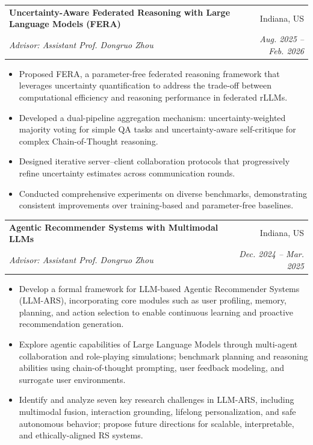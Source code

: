 \documentclass[letterpaper,10.8pt]{article}
\makeatletter
\newcommand{\resumeSubheading}[4]{
  \vspace{-1pt}\item
    \begin{tabular*}{0.97\textwidth}{l@{\extracolsep{\fill}}r}
      \textbf{#1} & #2 \\
      \textit{\small#3} & \textit{\small #4} \\
    \end{tabular*}\vspace{-5pt}
}
\makeatother
\begin{document}
\resumeSubheading
{Uncertainty-Aware Federated Reasoning with Large Language Models (FERA)}{Indiana, US}
{Advisor: Assistant Prof. Dongruo Zhou}{Aug. 2025 -- Feb. 2026}
\begin{itemize}[label=$\circ$, leftmargin=0.15in]
\setlength\itemsep{-0.1em}
\item Proposed FERA, a parameter-free federated reasoning framework that leverages uncertainty quantification to address the trade-off between computational efficiency and reasoning performance in federated rLLMs.
\item Developed a dual-pipeline aggregation mechanism: uncertainty-weighted majority voting for simple QA tasks and uncertainty-aware self-critique for complex Chain-of-Thought reasoning.
\item Designed iterative server–client collaboration protocols that progressively refine uncertainty estimates across communication rounds.
\item Conducted comprehensive experiments on diverse benchmarks, demonstrating consistent improvements over training-based and parameter-free baselines.
\end{itemize}



\resumeSubheading
{Agentic Recommender Systems with Multimodal LLMs}{Indiana, US}
{Advisor: Assistant Prof. Dongruo Zhou}{Dec. 2024 -- Mar. 2025}
\begin{itemize}[label=$\circ$, leftmargin=0.15in]
\setlength\itemsep{-0.1em}
\item Develop a formal framework for LLM-based Agentic Recommender Systems (LLM-ARS), incorporating core modules such as user profiling, memory, planning, and action selection to enable continuous learning and proactive recommendation generation.
\item Explore agentic capabilities of Large Language Models through multi-agent collaboration and role-playing simulations; benchmark planning and reasoning abilities using chain-of-thought prompting, user feedback modeling, and surrogate user environments.
\item Identify and analyze seven key research challenges in LLM-ARS, including multimodal fusion, interaction grounding, lifelong personalization, and safe autonomous behavior; propose future directions for scalable, interpretable, and ethically-aligned RS systems.
\end{itemize}
\end{document}
